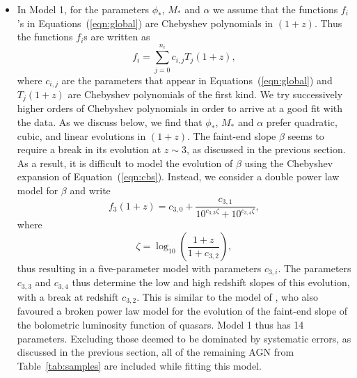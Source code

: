 \documentclass[fleqn,usenatbib]{mnras}
\begin{document}
\begin{itemize}

\item In Model 1, for the parameters $\phi_*$, $M_*$ and $\alpha$ we
  assume that the functions $f_i$'s
  in Equations~(\ref{eqn:global})
  are Chebyshev polynomials in $(1+z)$.  Thus the functions $f_i$s
  are
  written as
  \begin{equation}
    f_i=\sum_{j=0}^{n_i}c_{i,j}T_j(1+z),
    \label{eqn:cbs}
  \end{equation}
  where $c_{i,j}$ are the parameters that appear in
  Equations~(\ref{eqn:global}) and $T_j(1+z)$ are Chebyshev
  polynomials of the first kind.  We try successively higher orders of
  Chebyshev polynomials in order to arrive at a good fit with the
  data.
  As we discuss below, we find that $\phi_*$, $M_*$ and
  $\alpha$ prefer quadratic, cubic, and linear evolutions in $(1+z)$.
  The faint-end slope $\beta$ seems to require a break in its
  evolution at $z\sim 3$, as discussed in the previous section.  As a
  result, it is difficult to model the evolution of $\beta$ using the
  Chebyshev expansion of Equation~(\ref{eqn:cbs}).  Instead, we
  consider a double power law model for $\beta$ and write
  \begin{equation}
    f_3(1+z)=c_{3,0}+\frac{c_{3,1}}{10^{c_{3,3}\zeta}+10^{c_{3,4}\zeta}},
    \label{eqn:beta}
  \end{equation}
  where
  \begin{equation}
    \zeta = \log_{10}\left(\frac{1+z}{1+c_{3,2}}\right),
  \end{equation}
  thus resulting in a five-parameter model with parameters $c_{3,i}$.
  The parameters $c_{3,3}$ and $c_{3,4}$ thus determine the low and
  high redshift slopes of this evolution, with a break at redshift
  $c_{3,2}$.
  This is similar to the model of
  \citet{2007ApJ...654..731H}, who also favoured a broken power law
  model for the evolution of the faint-end slope of the bolometric
  luminosity function of quasars.  Model 1 thus has 14 parameters.
  Excluding those deemed to be dominated by systematic errors, as
  discussed in the previous section, all of the remaining AGN from
  Table~\ref{tab:samples} are included while fitting this model.


\end{itemize}
\end{document}
